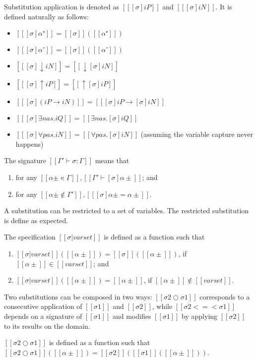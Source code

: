 \documentclass[acmsmall,natbib=false,review,anonymous]{acmart}
\begin{document}
\begin{algorithm}
  Substitution application is denoted as $[[ [σ]iP ]]$ and $[[ [σ]iN ]]$.
  It is defined naturally as follows:
    \begin{multicols}{2}
      \begin{itemize}
        \item[] $[[ [σ]α⁺ ]] = [[σ]] ([[α⁺]])$
        \item[] $[[ [σ]α⁻ ]] = [[σ]] ([[α⁻]])$
        \item[] $[[ [σ]↓iN ]] = [[↓[σ]iN]]$
        \item[] $[[ [σ]↑iP ]] = [[↑[σ]iP]]$
        \item[] $[[ [σ](iP → iN) ]] = [[ [σ]iP → [σ]iN ]]$
        \item[] $[[ [σ]∃nas.iQ ]] = [[∃nas.[σ]iQ]]$ 
        \item[] $[[ [σ]∀pas.iN ]] = [[∀pas.[σ]iN]]$ (assuming the variable capture never happens)
      \end{itemize}
    \end{multicols}
\end{algorithm}

\begin{definition}
  The signature $[[Γ' ⊢ σ : Γ]]$ means that
  \begin{enumerate}
    \item for any $[[α± ∊ Γ]], [[ Γ' ⊢ [σ]α± ]]$; and
    \item for any $[[α± ∉ Γ']], [[ [σ]α± = α± ]]$.
  \end{enumerate}
\end{definition}

A substitution can be restricted to a set of variables. 
The restricted substitution is define as expected. 
\begin{definition}
  The specification $[[σ  | varset]]$ is defined as
  a function such that 
  \begin{enumerate}
    \item $[[σ|varset]]([[α± ]]) = [[σ]]([[α± ]])$, if $[[α± ]] \in [[varset]]$; and
    \item $[[σ|varset]]([[α± ]]) = [[α± ]]$, if $[[α± ]] \notin [[varset]]$.
  \end{enumerate}
\end{definition}

Two substitutions can be composed in two ways:
$[[σ2 ○ σ1]]$ corresponds to a consecutive application of $[[σ1]]$ and $[[σ2]]$,
while $[[σ2 <=< σ1]]$
depends on a signature of $[[σ1]]$ and modifies $[[σ1]]$ by applying
$[[σ2]]$ to its results on the domain.
\begin{definition}
  $[[σ2 ○ σ1]]$ is defined as a function such that
  $[[σ2 ○ σ1]]([[α± ]]) = [[σ2]]([[σ1]]([[α± ]]))$.
\end{definition}
\end{document}
